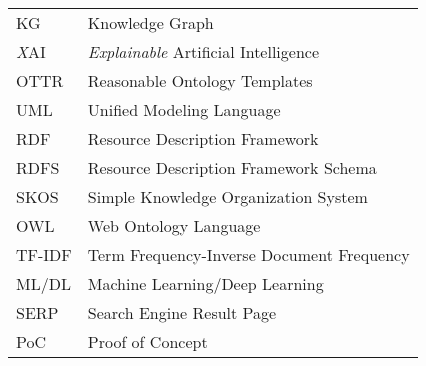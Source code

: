 \begin{table}[ht]
	\centering
	\begin{tabular}{p{}p{}}
		KG 					& Knowledge Graph 										\\
		\textit{X}AI		& \textit{Explainable} Artificial Intelligence			\\
		OTTR 				& Reasonable Ontology Templates 						\\
		UML 				& Unified Modeling Language 							\\
		RDF					& Resource Description Framework						\\
		RDFS				& Resource Description Framework Schema					\\
		SKOS				& Simple Knowledge Organization System					\\
		OWL					& Web Ontology Language 								\\
		TF-IDF 				& Term Frequency-Inverse Document Frequency 			\\
		ML/DL 				& Machine Learning/Deep Learning 			 			\\
		SERP 				& Search Engine Result Page 							\\
		PoC 				& Proof of Concept
	\end{tabular}
	\caption*{}
	\label{tab:abbrvs}
\end{table}

